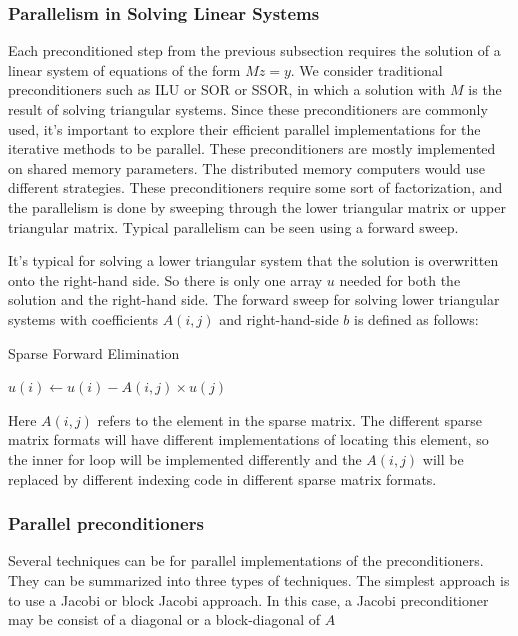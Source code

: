 \subsubsection{Parallelism in Solving Linear Systems}
Each preconditioned step from the previous subsection requires the solution of a linear system of equations of the form $Mz = y$. We consider traditional preconditioners such as ILU or SOR or SSOR, in which a solution with $M$ is the result of solving triangular systems. Since these preconditioners are commonly used, it's important to explore their efficient parallel implementations for the iterative methods to be parallel. These preconditioners are mostly implemented on shared memory parameters. The distributed memory computers would use different strategies. These preconditioners require some sort of factorization, and the parallelism is done by sweeping through the lower triangular matrix or upper triangular matrix. Typical parallelism can be seen using a forward sweep. 

It's typical for solving a lower triangular system that the solution is overwritten onto the right-hand side. So there is only one array $u$ needed for both the solution and the right-hand side. The forward sweep for solving lower triangular systems with coefficients $A(i,j)$ and right-hand-side $b$ is defined as follows:
\begin{algorithm}
\caption{Sparse Forward Elimination}\label{alg:two}
\begin{algorithmic}[1]
            \State $u(i) \gets u(i) - A(i,j) \times u(j)$
        \EndFor
    \EndFor
\end{algorithmic}
\end{algorithm}

Here $A(i,j)$ refers to the element in the sparse matrix. The different sparse matrix formats will have different implementations of locating this element, so the inner for loop will be implemented differently and the $A(i,j)$ will be replaced by different indexing code in different sparse matrix formats.

\subsubsection{Parallel preconditioners}
Several techniques can be for parallel implementations of the preconditioners. They can be summarized into three types of techniques.
The simplest approach is to use a Jacobi or block Jacobi approach. In this case, a Jacobi preconditioner may be consist of a diagonal or a block-diagonal of $A$

